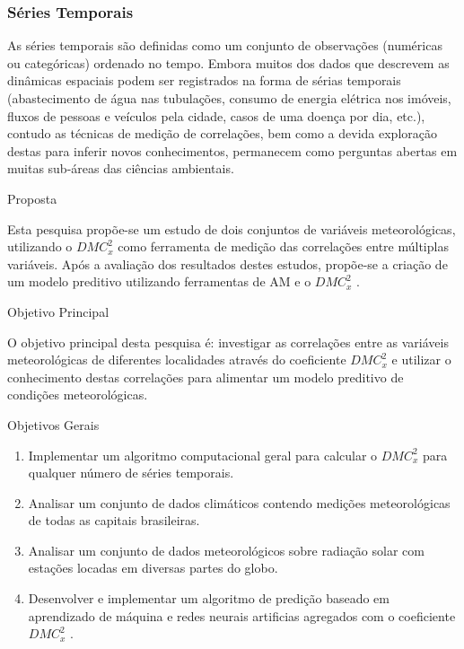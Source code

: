 \documentclass[10pt]{beamer}
\newcommand{\dmc}{\(DMC_x^2\) }
\begin{document}
\begin{frame}
  \frametitle{Séries Temporais}

  As séries temporais são definidas como um conjunto de observações (numéricas ou categóricas) ordenado no tempo.  Embora muitos dos dados que descrevem as dinâmicas espaciais podem ser registrados na forma de sérias temporais (abastecimento de água nas tubulações, consumo de energia elétrica nos imóveis, fluxos de pessoas e veículos pela cidade, casos de uma doença por dia, etc.), contudo as técnicas de medição de correlações, bem como a devida exploração destas para inferir novos conhecimentos, permanecem como perguntas abertas em muitas sub-áreas das ciências ambientais\cite{Bermudez-Edo2018}.

  

\end{frame}

\begin{frame}{Proposta}

  Esta pesquisa propõe-se um estudo de dois conjuntos de variáveis meteorológicas, utilizando o \dmc como ferramenta de medição das correlações entre múltiplas variáveis. Após a avaliação dos resultados destes estudos, propõe-se a criação de um modelo preditivo utilizando ferramentas de AM e o \dmc.
  
\end{frame}

\begin{frame}{Objetivo Principal}

  O objetivo principal desta pesquisa é: investigar as correlações entre as variáveis meteorológicas de diferentes localidades através do coeficiente \dmc e utilizar o conhecimento destas correlações para alimentar um modelo preditivo de condições meteorológicas.

  
\end{frame}

\begin{frame}{Objetivos Gerais}

  \begin{enumerate}
    \label{enum:obj_espec}
    \item Implementar um algoritmo computacional geral para calcular o \dmc para qualquer número de séries temporais.
    \item Analisar um conjunto de dados climáticos contendo medições meteorológicas de todas as capitais brasileiras.
    \item Analisar um conjunto de dados meteorológicos sobre radiação solar com estações locadas em diversas partes do globo.
    \item Desenvolver e implementar um algoritmo de predição baseado em aprendizado de máquina e redes neurais artificias agregados com o coeficiente \dmc.
\end{enumerate}

\end{frame}
\end{document}
